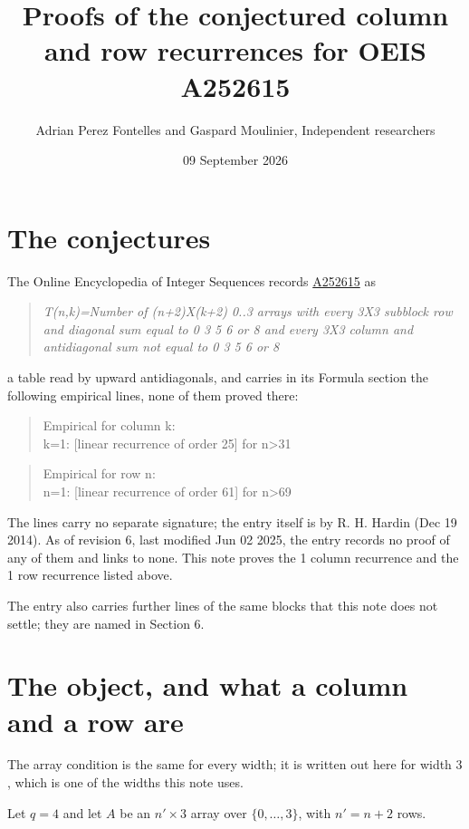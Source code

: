 \documentclass[11pt]{article}
\title{Proofs of the conjectured column and row recurrences for OEIS A252615}
\author{Adrian Perez Fontelles and Gaspard Moulinier, Independent researchers}
\date{09 September 2026}
\theoremstyle{definition}
\begin{document}
\maketitle
\section{The conjectures}

The Online Encyclopedia of Integer Sequences records \href{https://oeis.org/A252615}{A252615} as

\begin{quote}\itshape T(n,k)=Number of (n+2)X(k+2) 0..3 arrays with every 3X3 subblock row and diagonal sum equal to 0 3 5 6 or 8 and every 3X3 column and antidiagonal sum not equal to 0 3 5 6 or 8\end{quote}

a table read by upward antidiagonals, and carries in its Formula section the following empirical lines, none of them proved there:

\begin{quote}\ttfamily Empirical for column k:\\
k=1: [linear recurrence of order 25] for n>31\end{quote}

\begin{quote}\ttfamily Empirical for row n:\\
n=1: [linear recurrence of order 61] for n>69\end{quote}

The lines carry no separate signature; the entry itself is by R. H. Hardin (Dec 19 2014). As of revision 6, last modified Jun 02 2025, the entry records no proof of any of them and links to none. This note proves the 1 column recurrence and the 1 row recurrence listed above.

The entry also carries further lines of the same blocks that this note does not settle; they are named in Section 6.

\section{The object, and what a column and a row are}

The array condition is the same for every width; it is written out here for width $3$, which is one of the widths this note uses.

Let $q = 4$ and let $A$ be an $n' \times 3$ array over $\{0,\dots,3\}$, with $n' = n + 2$ rows.
\end{document}
